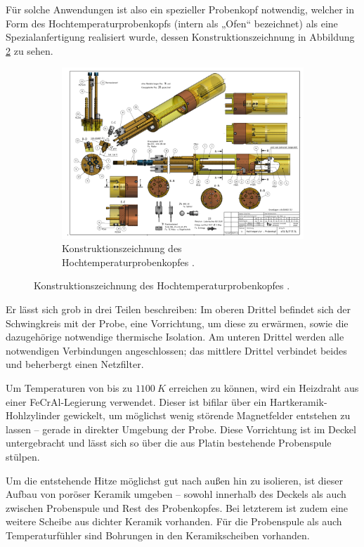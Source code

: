 Für solche Anwendungen ist also ein spezieller Probenkopf notwendig, welcher in Form des Hochtemperaturprobenkopfs (intern als „Ofen“ bezeichnet) als eine Spezialanfertigung realisiert wurde, dessen Konstruktionszeichnung in Abbildung \ref{fig:exp:ofen_aufbau} zu sehen.

\begin{figure}
	\begin{figure}[H]
		\includegraphics[width=1.05\textheight]{graphics/ofen/ofen_aufbau2.pdf}
		\caption{Konstruktionszeichnung des Hochtemperaturprobenkopfes \cite{Rudloff_blue_print}.}
		\label{fig:exp:ofen_aufbau}
	\end{figure}
\end{figure}

Er lässt sich grob in drei Teilen beschreiben: Im oberen Drittel befindet sich der Schwingkreis mit der Probe, eine Vorrichtung, um diese zu erwärmen, sowie die dazugehörige notwendige thermische Isolation. Am unteren Drittel werden alle notwendigen Verbindungen angeschlossen; das mittlere Drittel verbindet beides und beherbergt einen Netzfilter.

Um Temperaturen von bis zu $\SI{1100}{K}$ erreichen zu können, wird ein Heizdraht aus einer FeCrAl-Legierung verwendet. Dieser ist bifilar über ein Hartkeramik-Hohlzylinder gewickelt, um möglichst wenig störende Magnetfelder entstehen zu lassen -- gerade in direkter Umgebung der Probe. Diese Vorrichtung ist im Deckel untergebracht und lässt sich so über die aus Platin bestehende Probenspule stülpen.

Um die entstehende Hitze möglichst gut nach außen hin zu isolieren, ist dieser Aufbau von poröser Keramik umgeben -- sowohl innerhalb des Deckels als auch zwischen Probenspule und Rest des Probenkopfes. Bei letzterem ist zudem eine weitere Scheibe aus dichter Keramik vorhanden. Für die Probenspule als auch Temperaturfühler sind Bohrungen in den Keramikscheiben vorhanden.

